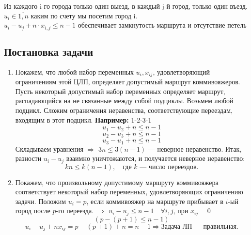 \documentclass[17pt]{extarticle}
\begin{document}
Из каждого i-го города только один выезд, в каждый j-й город, только один въезд. \\
$u_i \in \overline{1,n}$ каким по счету мы посетим город i. \\
$u_i-u_j + n \cdot x_{i,j} \leq n - 1$ обеспечивает замкнутость маршрута и отсутствие петель

\subsection{Постановка задачи}
\begin{enumerate}
    \item Покажем, что любой набор переменных \( u_i, x_{ij} \), удовлетворяющий ограничениям этой ЦЛП, определяет допустимый маршрут коммивояжеров.
          Пусть некоторый допустимый набор переменных определяет маршрут, распадающийся на не связанные между собой подциклы. Возьмем любой подцикл.
          Сложим ограничения неравенства, соответствующие переездам, входящим в этот подцикл.
          \textbf{Например:}
          1-2-3-1
          \[
              u_1 - u_2 + n \leq n-1
          \]
          \[
              u_2 - u_3 + n \leq n-1
          \]
          \[
              u_3 - u_1 + n \leq n-1
          \]
          Складываем уравнения \(\Rightarrow\) \( 3n \leq 3(n-1) \) — неверное неравенство.
          Итак, разности \( u_i - u_j \) взаимно уничтожаются, и получается неверное неравенство:
          \[
              kn \leq k(n-1), \quad \text{где } k \text{ — число переездов.}
          \]

    \item Покажем, что произвольному допустимому маршруту коммивояжера \\ соответствует некоторый набор переменных, удовлетворяющих ограничению задачи.
          Положим \( u_i = p \), если коммивояжер на маршруте прибывает в \( i \)-ый город после \( p \)-го переезда.
          \(\Rightarrow\) \( u_i - u_j \leq n-1 \quad \forall i, j \), при \( x_{ij} = 0 \)
          \[
              (p - (p+1) \leq n-1)
          \]
          \[
              u_i - u_j + nx_{ij} = p - (p+1) + n = n-1 \Rightarrow \text{Задача ЛП — правильная.}
          \]
\end{enumerate}
\end{document}
